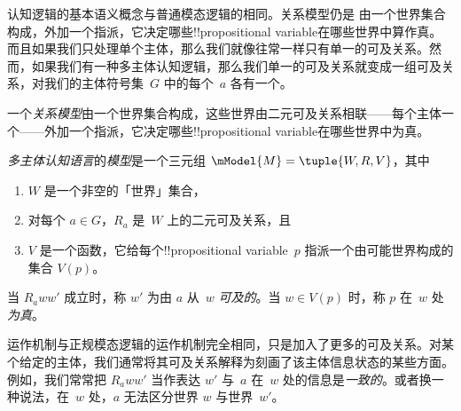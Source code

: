 \documentclass[../../../include/open-logic-section]{subfiles}
\begin{document}


认知逻辑的基本语义概念与普通模态逻辑的相同。关系模型仍是
由一个世界集合构成，外加一个指派，它决定哪些!!{propositional variable}在哪些世界中算作真。而且如果我们只处理单个主体，那么我们就像往常一样只有单一的可及关系。然而，如果我们有一种多主体认知逻辑，那么我们单一的可及关系就变成一组可及关系，对我们的主体符号集~$G$ 中的每个~$a$ 各有一个。

一个\emph{关系模型}由一个世界集合构成，这些世界由二元可及关系相联——每个主体一个——外加一个指派，它决定哪些!!{propositional variable}在哪些世界中为真。

\begin{defn}
  \emph{多主体认知语言}的\emph{模型}是一个三元组 $\mModel{M} = \tuple{W, R, V}$，其中
  \begin{enumerate}
  \item $W$ 是一个非空的「世界」集合，
  \item 对每个 $a \in G$，${R}_a$ 是~$W$ 上的二元可及关系，且
  \item $V$ 是一个函数，它给每个!!{propositional variable}~$p$ 指派一个由可能世界构成的集合 $V(p)$。
  \end{enumerate}
  当 $R_a ww'$ 成立时，称 $w'$ 为由 $a$ 从~$w$ \emph{可及的}。当 $w \in V(p)$ 时，称 $p$ 在~$w$ 处\emph{为真}。
\end{defn}

运作机制与正规模态逻辑的运作机制完全相同，只是加入了更多的可及关系。对某个给定的主体，我们通常将其可及关系解释为刻画了该主体信息状态的某些方面。例如，我们常常把 $R_a ww'$ 当作表达 $w'$ 与~$a$ 在~$w$ 处的信息是\emph{一致的}。或者换一种说法，在~$w$ 处，$a$ 无法区分世界 $w$ 与世界~$w'$。
\end{document}

